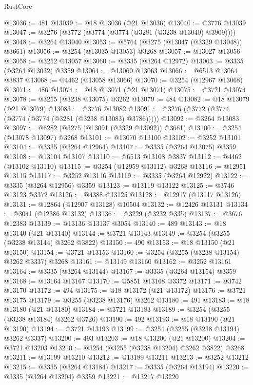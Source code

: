 \begin{lexlean}{RustCore}
\begin{coremodule}
@13036 := 481
@13039 := @18 @13036 (@21 @13036)
@13040 := @3776 @13039
@13047 := @3276 (@3772 (@3774 (@3774 (@3281 (@3238 @13040) @3909))))
@13048 := @3264 @13040
@13053 := @5764 (@3275 (@13047 (@3329 @13048)) @3661)
@13056 := @3254 (@13035 @13053) @3268
@13057 := @13027 @13056
@13058 := @3252 @13057
@13060 := @3335 (@3264 @12972)
@13063 := @3335 (@3264 @13032) @3359
@13064 := @13060 @13063
@13066 := @6513 @13064 @3837
@13068 := @4462 (@13058 @13066)
@13070 := @3254 (@12967 @13068)
@13071 := 486
@13074 := @18 @13071 (@21 @13071)
@13075 := @3721 @13074
@13078 := @3255 (@3238 @13075) @3262
@13079 := 484
@13082 := @18 @13079 (@21 @13079)
@13083 := @3776 @13082
@13091 := @3276 (@3772 (@3774 (@3774 (@3774 (@3281 (@3238 @13083) @3786)))))
@13092 := @3264 @13083
@13097 := @6282 (@3275 (@13091 (@3329 @13092)) @3661)
@13100 := @3254 (@13078 @13097) @3268
@13101 := @13070 @13100
@13102 := @3252 @13101
@13104 := @3335 (@3264 @12964)
@13107 := @3335 (@3264 @13075) @3359
@13108 := @13104 @13107
@13110 := @6513 @13108 @3837
@13112 := @4462 (@13102 @13110)
@13115 := @3254 (@12959 @13112) @3268
@13116 := @12951 @13115
@13117 := @3252 @13116
@13119 := @3335 (@3264 @12922)
@13122 := @3335 (@3264 @12956) @3359
@13123 := @13119 @13122
@13125 := @3746 @13123 @3372
@13126 := @4388 @13125
@13128 := @12917 (@13117 @13126)
@13131 := @12864 (@12907 @13128) @10504
@13132 := @12426 @13131
@13134 := @3041 (@12386 @13132)
@13136 := @3229 (@3232 @335)
@13137 := @3676 @12383
@13139 := @13136 @13137 @3054
@13140 := 489
@13143 := @18 @13140 (@21 @13140)
@13144 := @3721 @13143
@13149 := @3254 (@3255 (@3238 @13144) @3262 @3822)
@13150 := 490
@13153 := @18 @13150 (@21 @13150)
@13154 := @3721 @13153
@13160 := @3254 (@3255 (@3238 @13154) @3262 @3337) @3268
@13161 := @13149 @13160
@13162 := @3252 @13161
@13164 := @3335 (@3264 @13144)
@13167 := @3335 (@3264 @13154) @3359
@13168 := @13164 @13167
@13170 := @5851 @13168 @3372
@13171 := @3742 @13170
@13172 := 494
@13175 := @18 @13172 (@21 @13172)
@13176 := @3721 @13175
@13179 := @3255 (@3238 @13176) @3262
@13180 := 491
@13183 := @18 @13180 (@21 @13180)
@13184 := @3721 @13183
@13189 := @3254 (@3255 (@3238 @13184) @3262 @3726)
@13190 := 492
@13193 := @18 @13190 (@21 @13190)
@13194 := @3721 @13193
@13199 := @3254 (@3255 (@3238 @13194) @3262 @3337)
@13200 := 493
@13203 := @18 @13200 (@21 @13200)
@13204 := @3721 @13203
@13210 := @3254 (@3255 (@3238 @13204) @3262 @3822) @3268
@13211 := @13199 @13210
@13212 := @13189 @13211
@13213 := @3252 @13212
@13215 := @3335 (@3264 @13184)
@13217 := @3335 (@3264 @13194)
@13220 := @3335 (@3264 @13204) @3359
@13221 := @13217 @13220

\end{coremodule}
\end{lexlean}
